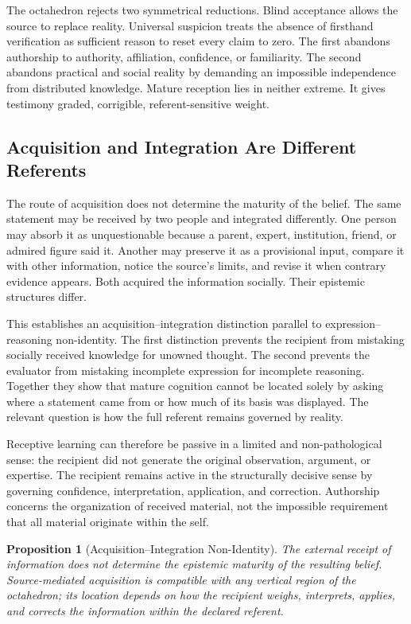 \documentclass[11pt]{article}
\newtheorem{proposition}{Proposition}
\begin{document}
The octahedron rejects two symmetrical reductions. Blind acceptance allows the source to replace reality. Universal suspicion treats the absence of firsthand verification as sufficient reason to reset every claim to zero. The first abandons authorship to authority, affiliation, confidence, or familiarity. The second abandons practical and social reality by demanding an impossible independence from distributed knowledge. Mature reception lies in neither extreme. It gives testimony graded, corrigible, referent-sensitive weight.

\subsection{Acquisition and Integration Are Different Referents}

The route of acquisition does not determine the maturity of the belief. The same statement may be received by two people and integrated differently. One person may absorb it as unquestionable because a parent, expert, institution, friend, or admired figure said it. Another may preserve it as a provisional input, compare it with other information, notice the source's limits, and revise it when contrary evidence appears. Both acquired the information socially. Their epistemic structures differ.

This establishes an acquisition--integration distinction parallel to expression--reasoning non-identity. The first distinction prevents the recipient from mistaking socially received knowledge for unowned thought. The second prevents the evaluator from mistaking incomplete expression for incomplete reasoning. Together they show that mature cognition cannot be located solely by asking where a statement came from or how much of its basis was displayed. The relevant question is how the full referent remains governed by reality.

Receptive learning can therefore be passive in a limited and non-pathological sense: the recipient did not generate the original observation, argument, or expertise. The recipient remains active in the structurally decisive sense by governing confidence, interpretation, application, and correction. Authorship concerns the organization of received material, not the impossible requirement that all material originate within the self.

\begin{proposition}[Acquisition--Integration Non-Identity]
The external receipt of information does not determine the epistemic maturity of the resulting belief. Source-mediated acquisition is compatible with any vertical region of the octahedron; its location depends on how the recipient weighs, interprets, applies, and corrects the information within the declared referent.
\end{proposition}
\end{document}
